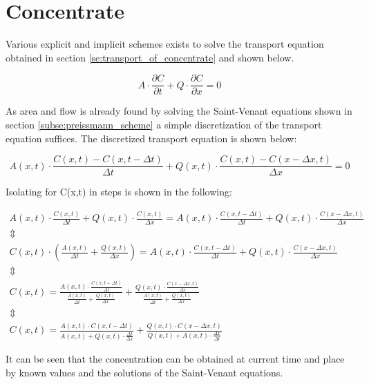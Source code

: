 \section{Concentrate}\label{sec:concentrate}

Various explicit and implicit schemes exists to solve the transport equation obtained in section \ref{se:transport_of_concentrate} and shown below.

\begin{equation}
A \cdot \frac{\partial C}{\partial t} + Q \cdot \frac{\partial C}{\partial x} = 0
\label{eq:transport_sim}
\end{equation}

As area and flow is already found by solving the Saint-Venant equations shown in section \ref{subse:preissmann_scheme} a simple discretization of the transport equation suffices.
The discretized transport equation is shown below:

\begin{equation}
	A(x,t) \cdot \frac{C(x,t) - C(x,t-\Delta t)}{\Delta t} + Q(x,t) \cdot \frac{C(x,t)-C(x-\Delta x,t)}{\Delta x} = 0
\end{equation}

Isolating for C(x,t) in steps is shown in the following:

\begin{equation}
\begin{array}{l}
	A(x,t) \cdot \frac{C(x,t)}{\Delta t} + Q(x,t) \cdot \frac{C(x,t)}{\Delta x} = A(x,t) \cdot \frac{C(x,t-\Delta t)}{\Delta t} + Q(x,t) \cdot \frac{C(x-\Delta x,t)}{\Delta x} \\

	\Updownarrow \\

C(x,t) \cdot \left( \frac{A(x,t)}{\Delta t} + \frac{Q(x,t)}{\Delta x} \right) = A(x,t) \cdot \frac{C(x,t-\Delta t)}{\Delta t} + Q(x,t) \cdot \frac{C(x-\Delta x,t)}{\Delta x} \\

\Updownarrow \\

C(x,t) = \frac{ A(x,t) \cdot \frac{C(x,t-\Delta t)}{\Delta t}}{\frac{A(x,t)}{\Delta t} + \frac{Q(x,t)}{\Delta x}}   +   \frac{ Q(x,t) \cdot \frac{C(x-\Delta x,t)}{\Delta x}}{\frac{A(x,t)}{\Delta t} + \frac{Q(x,t)}{\Delta x}} \\

\Updownarrow \\

C(x,t) = \frac{ A(x,t) \cdot C(x,t-\Delta t) }{ A(x,t)+Q(x,t) \cdot \frac{\Delta t}{ \Delta x} } + \frac{Q(x,t) \cdot C(x-\Delta x,t)}{Q(x,t)+A(x,t)\cdot \frac{\Delta x}{\Delta t}}

\end{array}	
\end{equation}

It can be seen that the concentration can be obtained at current time and place by known values and the solutions of the Saint-Venant equations.
